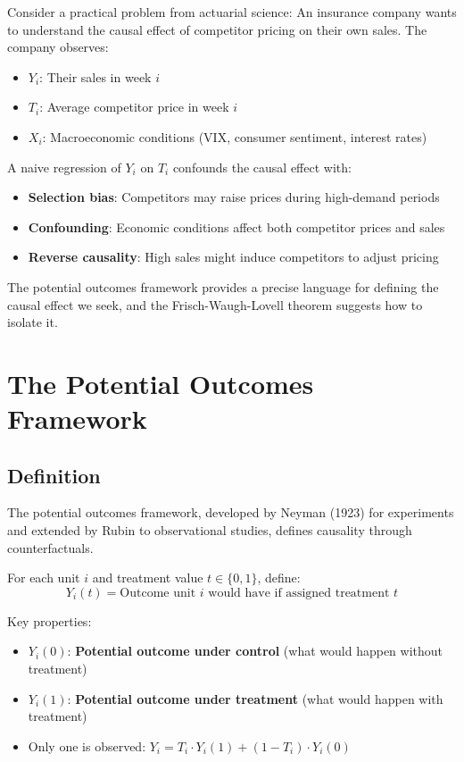 Consider a practical problem from actuarial science: An insurance
company wants to understand the causal effect of competitor pricing on
their own sales. The company observes:

\begin{itemize}
\item
  \(Y_i\): Their sales in week \(i\)
\item
  \(T_i\): Average competitor price in week \(i\)
\item
  \(X_i\): Macroeconomic conditions (VIX, consumer sentiment, interest
  rates)
\end{itemize}

A naive regression of \(Y_i\) on \(T_i\) confounds the causal effect
with:

\begin{itemize}
\item
  \textbf{Selection bias}: Competitors may raise prices during
  high-demand periods
\item
  \textbf{Confounding}: Economic conditions affect both competitor
  prices and sales
\item
  \textbf{Reverse causality}: High sales might induce competitors to
  adjust pricing
\end{itemize}

The potential outcomes framework provides a precise language for
defining the causal effect we seek, and the Frisch-Waugh-Lovell theorem
suggests how to isolate it.

\section{The Potential Outcomes
Framework}\label{_the_potential_outcomes_framework}

\subsection{Definition}\label{_definition}

The potential outcomes framework, developed by Neyman (1923) for
experiments and extended by Rubin \cite{rubin1974estimating} to
observational studies, defines causality through counterfactuals.

\begin{definition}
\label{def:potential_outcomes}
%
For each unit $i$ and treatment value $t \in \{0, 1\}$, define:
\[
Y_i(t) = \text{Outcome unit } i \text{ would have if assigned treatment } t
\]

Key properties:
\begin{itemize}
\item $Y_i(0)$: \textbf{Potential outcome under control} (what would happen without treatment)
\item $Y_i(1)$: \textbf{Potential outcome under treatment} (what would happen with treatment)
\item Only one is observed: $Y_i = T_i \cdot Y_i(1) + (1 - T_i) \cdot Y_i(0)$
\end{itemize}
\end{definition}

